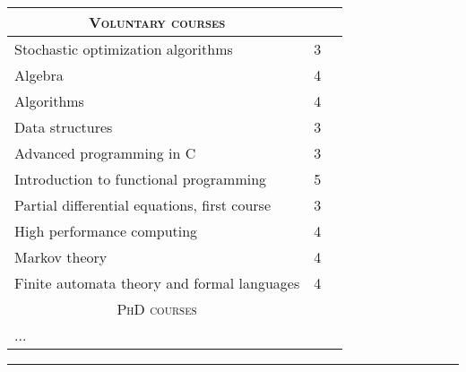 \documentclass[a4paper,10pt]{article} %
\begin{document}
\begin{center}
\begin{tabular}{lcc}
\multicolumn{1}{c}{\textsc{Voluntary courses}} & \\
\hline
Stochastic optimization algorithms & 3\\
Algebra & 4\\
Algorithms & 4\\
Data structures & 3\\
Advanced programming in C & 3\\
Introduction to functional programming & 5\\
Partial differential equations, first course & 3\\
High performance computing & 4\\
Markov theory & 4\\
Finite automata theory and formal languages & 4\\

\multicolumn{1}{c}{\textsc{PhD courses}} & \\
\hline
...
\end{tabular}
\end{center}
\bigskip
\hrule
\bigskip


\end{document}
